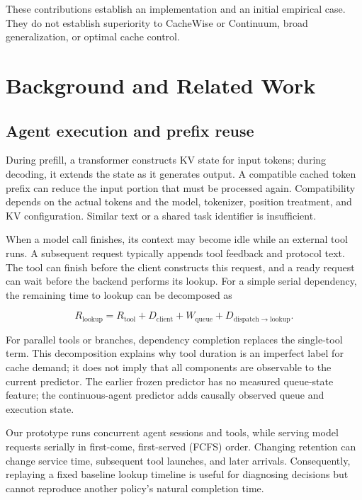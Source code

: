 \documentclass[sigconf, screen, review]{acmart}
\begin{document}
These contributions establish an implementation and an initial empirical
case. They do not establish superiority to CacheWise or Continuum, broad
generalization, or optimal cache control.

\section{Background and Related
Work}\label{background-and-related-work}

\subsection{Agent execution and prefix
reuse}\label{agent-execution-and-prefix-reuse}

During prefill, a transformer constructs KV state for input tokens;
during decoding, it extends the state as it generates output. A
compatible cached token prefix can reduce the input portion that must be
processed again. Compatibility depends on the actual tokens and the
model, tokenizer, position treatment, and KV configuration. Similar text
or a shared task identifier is insufficient.

When a model call finishes, its context may become idle while an
external tool runs. A subsequent request typically appends tool feedback
and protocol text. The tool can finish before the client constructs this
request, and a ready request can wait before the backend performs its
lookup. For a simple serial dependency, the remaining time to lookup can
be decomposed as

\[
R_{\mathrm{lookup}}=R_{\mathrm{tool}}+D_{\mathrm{client}}
 +W_{\mathrm{queue}}+D_{\mathrm{dispatch\to lookup}}.
\]

For parallel tools or branches, dependency completion replaces the
single-tool term. This decomposition explains why tool duration is an
imperfect label for cache demand; it does not imply that all components
are observable to the current predictor. The earlier frozen predictor has no
measured queue-state feature; the continuous-agent predictor adds
causally observed queue and execution state.

Our prototype runs concurrent agent sessions and tools, while serving
model requests serially in first-come, first-served (FCFS) order.
Changing retention can change service time, subsequent tool launches,
and later arrivals. Consequently, replaying a fixed baseline lookup
timeline is useful for diagnosing decisions but cannot reproduce another
policy's natural completion time.
\end{document}
